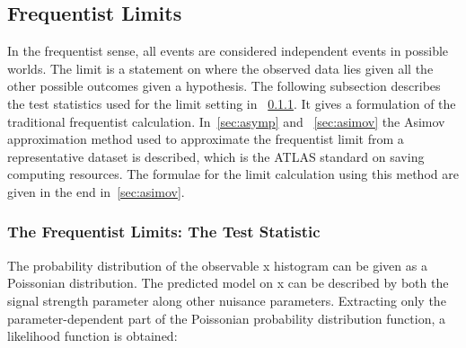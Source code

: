 %



\subsection{Frequentist Limits}
\label{sec:freq}
In the frequentist sense, all events are considered independent events in possible worlds. The limit is a statement on where the observed data lies given all the other possible outcomes given a hypothesis. 
The following subsection describes the test statistics used for the limit setting in ~\ref{sec:freqTestStats}. It gives a formulation of the traditional frequentist calculation. In~\ref{sec:asymp} and ~\ref{sec:asimov} the Asimov approximation method used to approximate the frequentist limit from a representative dataset is described, which is the ATLAS standard on saving computing resources. The formulae for the limit calculation using this method are given in the end
in~\ref{sec:asimov}.

\subsubsection{The Frequentist Limits: The Test Statistic}
\label{sec:freqTestStats}

The probability distribution of the observable x histogram can be given as a Poissonian distribution. The predicted model on x can be described by both the signal strength parameter along other nuisance parameters. Extracting only the parameter-dependent part of the Poissonian probability distribution function, a likelihood function is obtained:

